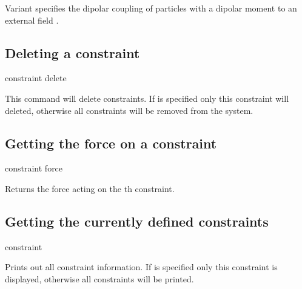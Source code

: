 Variant  specifies the dipolar coupling of particles with a dipolar
moment to an external field   . 

\subsection{Deleting a constraint}
\begin{essyntax}
  constraint delete  
\end{essyntax}

This command will delete constraints. If  is specified only this
constraint will deleted, otherwise all constraints will be removed from the
system. 

\subsection{Getting the force on a constraint}
\begin{essyntax}
constraint force  
\end{essyntax}
Returns the force acting on the th constraint.


\subsection{Getting the currently defined constraints}
\begin{essyntax}
constraint   
\end{essyntax}
Prints out all constraint information. If  is specified only this
constraint is displayed, otherwise all constraints will be printed.

